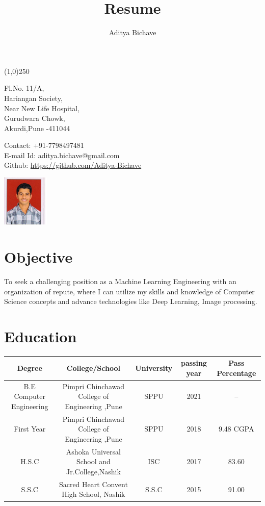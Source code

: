 \documentclass[10pt]{article}
\makeatletter
\renewcommand{\maketitle}{
\begin{center}
{\LARGE\bfseries
\theauthor}

\vspace{.25em}
\line(1,0){250}
\end{center}
\begin{multicols}{2}
\noindent
Fl.No. 11/A,\\
Hariangan Society,\\
Near New Life Hospital,\\
Gurudwara Chowk,\\
Akurdi,Pune -411044\\

\columnbreak
\begin{flushright}
Contact: +91-7798497481\\
E-mail Id: aditya.bichave@gmail.com\\
Github: \url{https://github.com/Aditya-Bichave}
\end{flushright}
\noindent
\hspace{10em}
\includegraphics[width = 6em]{Aditya.jpg}

\end{multicols}



}
\makeatother
\begin{document}
\title{Resume}
\author{Aditya Bichave}
\maketitle

\section{Objective}

To seek a challenging position as a Machine Learning Engineering with an organization of repute, where I can utilize my skills and knowledge of Computer Science concepts and advance technologies like Deep Learning, Image processing.

\section{Education}

\begin{tabular}[8pt]{| c | c | c | c | c |}
\hline
	Degree & College/School & University & passing year & Pass Percentage\\
\hline
	B.E Computer Engineering & Pimpri Chinchawad College of Engineering ,Pune & SPPU & 2021 & -- \\
\hline
	First Year & Pimpri Chinchawad College of Engineering ,Pune & SPPU & 2018 & 9.48 CGPA \\
\hline
	H.S.C & Ashoka Universal School and Jr.College,Nashik & ISC & 2017 & 83.60 \\
\hline
	S.S.C & Sacred Heart Convent High School, Nashik & S.S.C & 2015 & 91.00\\
\hline
\end{tabular} 
\end{document}
